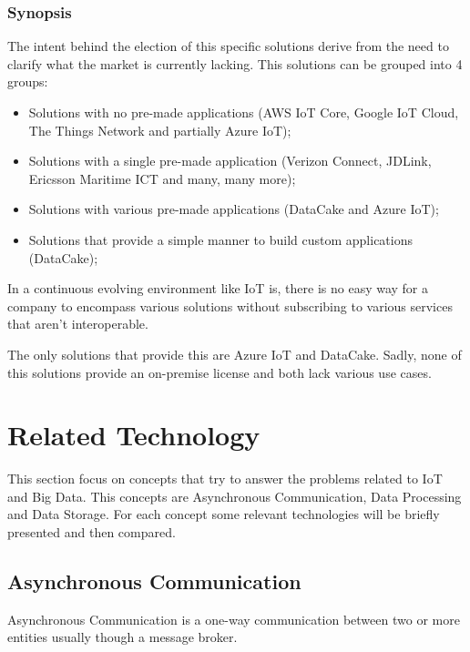 \subsubsection{Synopsis}
\label{subsec:stateofart:iot:solutions:synopsis}

The intent behind the election of this specific solutions derive from the need to clarify what the market is currently lacking.
This solutions can be grouped into 4 groups:

\begin{itemize}
    \item Solutions with no pre-made applications (AWS IoT Core, Google IoT Cloud, The Things Network and partially Azure IoT);
    \item Solutions with a single pre-made application (Verizon Connect, JDLink, Ericsson Maritime ICT and many, many more);
    \item Solutions with various pre-made applications (DataCake and Azure IoT);
    \item Solutions that provide a simple manner to build custom applications (DataCake);
\end{itemize}

In a continuous evolving environment like \gls{IoT} is, there is no easy way for a company to encompass various solutions without subscribing to various services that aren't interoperable.

The only solutions that provide this are Azure IoT and DataCake.
Sadly, none of this solutions provide an on-premise license and both lack various use cases.

\section{Related Technology}
\label{sec:stateofart:tech}

This section focus on concepts that try to answer the problems related to \gls{IoT} and Big Data.
This concepts are Asynchronous Communication, Data Processing and Data Storage.
For each concept some relevant technologies will be briefly presented and then compared.

\subsection{Asynchronous Communication}
\label{subsec:stateofart:tech:async}

Asynchronous Communication is a one-way communication between two or more entities usually though a message broker.

